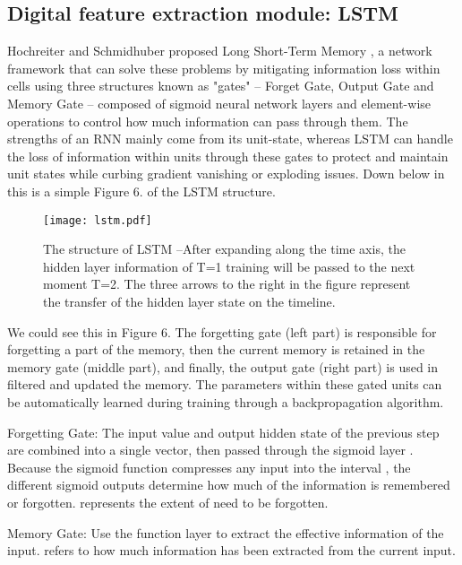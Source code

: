 \documentclass{ecai}
\begin{document}
\subsection{Digital feature extraction module: LSTM}






Hochreiter and Schmidhuber proposed Long Short-Term Memory \cite{hochreiter_long_1997}, a network framework that can solve these problems by mitigating information loss within cells using three structures known as "gates" -- Forget Gate, Output Gate and Memory Gate -- composed of sigmoid neural network layers and element-wise operations to control how much information can pass through them. The strengths of an RNN mainly come from its unit-state, whereas LSTM can handle the loss of information within units through these gates to protect and maintain unit states while curbing gradient vanishing or exploding issues. Down below in this is a simple Figure 6. of the LSTM structure.

\begin{figure}[htp]
    \centering
    \texttt{[image: lstm.pdf]}
     \caption{The structure of LSTM --After expanding along the time axis, the hidden layer information of T=1 training will be passed to the next moment T=2. The three arrows to the right in the figure represent the transfer of the hidden layer state on the timeline.}
    \label{fig:network}
\end{figure}



We could see this in Figure 6. The forgetting gate (left part) is responsible for forgetting a part of the memory, then the current memory is retained in the memory gate (middle part), and finally, the output gate (right part) is used in filtered and updated the memory. The parameters within these gated units can be automatically learned during training through a backpropagation algorithm.


Forgetting Gate: The input value  and output hidden state of the previous step  are combined into a single vector, then passed through the sigmoid layer . Because the sigmoid function  compresses any input into the interval , the different sigmoid  outputs determine how much of the information is remembered or forgotten.  represents the extent of  need to be forgotten.

Memory Gate: Use the  function layer to extract the effective information of the input.  refers to how much information has been extracted from the current input.
\end{document}
